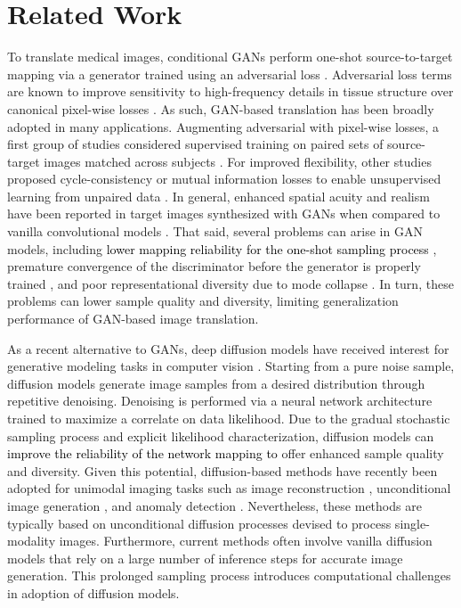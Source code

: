 \documentclass[journal,twoside,web]{ieeecolor}
\newcommand*{\revhl}{\textcolor{black}}
\begin{document}
\section{Related Work}
To translate medical images, conditional GANs perform one-shot source-to-target mapping via a generator trained using an adversarial loss \cite{nie2018}. Adversarial loss terms are known to improve sensitivity to high-frequency details in tissue structure over canonical pixel-wise losses \cite{dar2019image}. As such, GAN-based translation has been broadly adopted in many applications. Augmenting adversarial with pixel-wise losses, a first group of studies considered supervised training on paired sets of source-target images matched across subjects \cite{armanious2019,mmgan,li2019,yu2019,zhou2020,wang2020}. For improved flexibility, other studies proposed cycle-consistency or mutual information losses to enable unsupervised learning from unpaired data \cite{chartsias2017,wolterink2017,hiasa2018,yang2018,dar2019image,sohail2019,ge2019,dong2019}. In general, enhanced spatial acuity and realism have been reported in target images synthesized with GANs when compared to vanilla convolutional models \cite{dar2019image}. That said, several problems can arise in GAN models, including \revhl{lower mapping reliability for the one-shot sampling process \cite{DiffBeatsGAN}}, premature convergence of the discriminator before the generator is properly trained \cite{lan2020}, and poor representational diversity due to mode collapse \cite{pix2pix}. In turn, these problems can lower sample quality and diversity, limiting generalization performance of GAN-based image translation. 

As a recent alternative to GANs, deep diffusion models have received interest for generative modeling tasks in computer vision \cite{DDPM,DiffBeatsGAN}. Starting from a pure noise sample, diffusion models generate image samples from a desired distribution through repetitive denoising. Denoising is performed via a neural network architecture trained to maximize a correlate on data likelihood. Due to the gradual stochastic sampling process and explicit likelihood characterization, diffusion models can \revhl{improve the reliability of the network mapping to} offer enhanced sample quality and diversity. Given this potential, diffusion-based methods have recently been adopted for unimodal imaging tasks such as image reconstruction \cite{jalaln2021nips,chung2022media,song2022solving,adadiff,denoisingmri}, unconditional image generation \cite{CardosoLatentDiffusion}, and anomaly detection \cite{diffusion_anomaly_detection,cardoso_anomaly_diffusion}. Nevertheless, these methods are typically based on unconditional diffusion processes devised to process single-modality images. Furthermore, current methods often involve vanilla diffusion models that rely on a large number of inference steps for accurate image generation. This prolonged sampling process introduces computational challenges in adoption of diffusion models.
\end{document}
